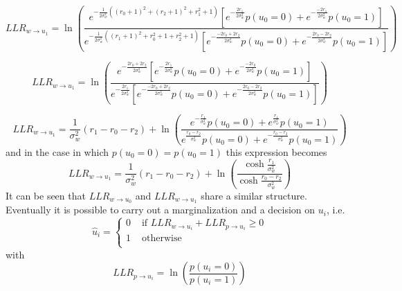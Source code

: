 \documentclass[10pt]{article}
\begin{document}
\begin{equation}
	LLR_{w\rightarrow u_1} = \ln 
		\left( 
		\frac{
			e^{-\frac{1}{2\sigma_w^2} ((r_0+1)^2+(r_2+1)^2+r_1^2+1)}
				\left[
					e^{-\frac{2r_1}{2\sigma_w^2}}p(u_0=0)+e^{-\frac{-2r_1}{2\sigma_w^2}}p(u_0=1)
				\right]
		}{
			e^{-\frac{1}{2\sigma_w^2} ((r_1+1)^2+r_0^2+1+r_2^2+1)}
				\left[
					e^{-\frac{-2r_0 + 2r_2}{2\sigma_w^2}}p(u_0=0)+e^{-\frac{2r_0 - 2r_2}{2\sigma_w^2}}p(u_0=1)
				\right]
		}
		\right)
\end{equation}

\begin{equation}
	LLR_{w\rightarrow u_1} = \ln 
		\left( 
		\frac{
			e^{-\frac{2r_0+2r_2}{2\sigma_w^2}}
				\left[
					e^{-\frac{2r_1}{2\sigma_w^2}}p(u_0=0)+e^{-\frac{-2r_0}{2\sigma_w^2}}p(u_0=1)
				\right]
		}{
			e^{-\frac{2r_1}{2\sigma_w^2}}
				\left[
					e^{-\frac{-2r_0 + 2r_2}{2\sigma_w^2}}p(u_0=0)+e^{-\frac{2r_0 - 2r_2}{2\sigma_w^2}}p(u_0=1)
				\right]
		}
		\right)
\end{equation}

\begin{equation}
	LLR_{w\rightarrow u_1} = 
	\frac{1}{\sigma_w^2}(r_1 - r_0 - r_2) + 
	\ln 
		\left( 
		\frac{
			e^{-\frac{r_1}{\sigma_w^2}}p(u_0=0)+e^{\frac{r_1}{\sigma_w^2}}p(u_0=1)
		}{
			e^{\frac{r_0 - r_2}{\sigma_w^2}}p(u_0=0)+e^{-\frac{r_0 - r_2}{\sigma_w^2}}p(u_0=1)
		}
		\right)
\end{equation}
and in the case in which $p(u_0 = 0) = p(u_0 = 1)$ this expression becomes
\begin{equation}\label{eq:llru1final}
	LLR_{w\rightarrow u_1} = 
	\frac{1}{\sigma_w^2}(r_1 - r_0 - r_2) + 
	\ln 
		\left( 
		\frac{
			\cosh{\frac{r_1}{\sigma_w^2}}
		}{
			\cosh{\frac{r_0-r_2}{\sigma_w^2}}
		}
		\right)
\end{equation}
It can be seen that $LLR_{w\rightarrow u_0}$ and $LLR_{w\rightarrow u_1}$ share a similar structure.
Eventually it is possible to carry out a marginalization and a decision on $u_i$, i.e.
\begin{equation}
\hat{u}_i = \begin{cases}
				0 & \mbox{ if } LLR_{w\rightarrow u_i} + LLR_{p\rightarrow u_i} \ge 0 \\
				1 & \mbox{ otherwise } \\
			\end{cases}
\end{equation}
with
\begin{equation}
LLR_{p\rightarrow u_i} = \ln \left( \frac{p(u_i = 0)}{p(u_i=1)} \right)
\end{equation}
\end{document}
